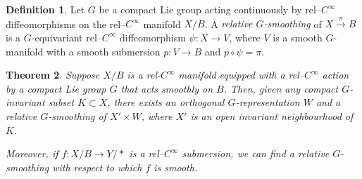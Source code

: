 \documentclass[11pt,psamsfonts, oneside, reqno]{amsart}
\newcommand{\sub}{\subset}%
\newcommand{\g}{\circ}%
\newcommand{\cl}{\colon}
\newcommand{\xra}{\xrightarrow}
\newtheorem{theorem}{Theorem}[section]
\theoremstyle{definition}
\newtheorem{definition}[theorem]{Definition}
\theoremstyle{remark}
\numberwithin{equation}{section}
\begin{document}
\begin{definition} Let $G$ be a compact Lie group acting continuously by rel--$C^\infty$ diffeomorphisms on the rel--$C^\infty$ manifold $X/B$. A \emph{relative $G$-smoothing} of $X\xra{\pi} B$ is a $G$-equivariant rel--$C^\infty$ diffeomorphism $\psi \cl X\to V$, where $V$ is a smooth $G$-manifold with a smooth submersion $p \cl V\to B$ and $p\g\psi = \pi$.
\end{definition}

\begin{theorem}\label{thm:to-smooth} Suppose $X/B$ is a rel-$C^\infty$ manifold equipped with a rel--$C^\infty$ action by a compact Lie group $G$ that acts smoothly on $B$. Then, given any compact $G$-invariant subset $K \sub X$,  there exists an orthogonal $G$-representation $W$ and a relative $G$-smoothing of $X'\times W$, where $X'$ is an open invariant neighbourhood of $K$.\par
	Moreover, if $f\cl X/B\to Y/*$ is a rel--$C^\infty$ submersion, we can find a relative $G$-smoothing with respect to which $f$ is smooth.
\end{theorem}
\end{document}
